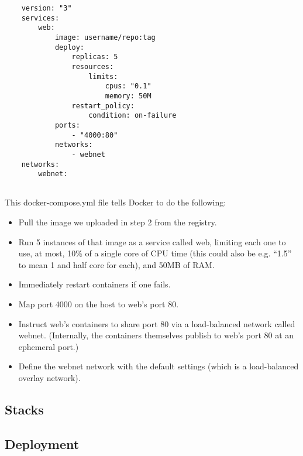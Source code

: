 \begin{lstlisting}
    version: "3"
    services: 
        web: 
            image: username/repo:tag
            deploy: 
                replicas: 5
                resources:
                    limits: 
                        cpus: "0.1"
                        memory: 50M
                restart_policy: 
                    condition: on-failure
            ports: 
                - "4000:80"
            networks: 
                - webnet
    networks: 
        webnet:
        
\end{lstlisting}

This docker-compose.yml file tells Docker to do the following:
\begin{itemize}
    \item Pull the image we uploaded in step 2 from the registry.
    \item Run 5 instances of that image as a service called web, limiting each one to use, at most, 10\% of a single core of CPU time (this could also be e.g. “1.5” to mean 1 and half core for each), and 50MB of RAM.
    \item Immediately restart containers if one fails.
    \item Map port 4000 on the host to web’s port 80.
    \item Instruct web’s containers to share port 80 via a load-balanced network called webnet. (Internally, the containers themselves publish to web’s port 80 at an ephemeral port.)
    \item Define the webnet network with the default settings (which is a load-balanced overlay network).
\end{itemize}




\subsection{Stacks}

\subsection{Deployment}

